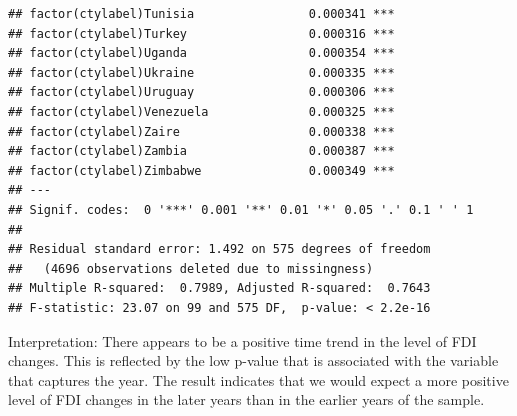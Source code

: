 \documentclass[12pt]{article}\usepackage[]{graphicx}\usepackage[]{color}
\makeatletter
\newenvironment{kframe}{%
 \def\at@end@of@kframe{}%
 \ifinner\ifhmode%
  \def\at@end@of@kframe{\end{minipage}}%
  \begin{minipage}{\columnwidth}%
 \fi\fi%
 \def\FrameCommand##1{\hskip\@totalleftmargin \hskip-\fboxsep
 \colorbox{shadecolor}{##1}\hskip-\fboxsep
     \hskip-\linewidth \hskip-\@totalleftmargin \hskip\columnwidth}%
 \MakeFramed {\advance\hsize-\width
   \@totalleftmargin\z@ \linewidth\hsize
   \@setminipage}}%
 {\par\unskip\endMakeFramed%
 \at@end@of@kframe}
\newenvironment{knitrout}{}{} %
\makeatother
\begin{document}
\begin{knitrout}
\begin{kframe}
\begin{verbatim}
## factor(ctylabel)Tunisia                0.000341 ***
## factor(ctylabel)Turkey                 0.000316 ***
## factor(ctylabel)Uganda                 0.000354 ***
## factor(ctylabel)Ukraine                0.000335 ***
## factor(ctylabel)Uruguay                0.000306 ***
## factor(ctylabel)Venezuela              0.000325 ***
## factor(ctylabel)Zaire                  0.000338 ***
## factor(ctylabel)Zambia                 0.000387 ***
## factor(ctylabel)Zimbabwe               0.000349 ***
## ---
## Signif. codes:  0 '***' 0.001 '**' 0.01 '*' 0.05 '.' 0.1 ' ' 1
## 
## Residual standard error: 1.492 on 575 degrees of freedom
##   (4696 observations deleted due to missingness)
## Multiple R-squared:  0.7989,	Adjusted R-squared:  0.7643 
## F-statistic: 23.07 on 99 and 575 DF,  p-value: < 2.2e-16
\end{verbatim}
\end{kframe}
\end{knitrout}

Interpretation: There appears to be a positive time trend in the level of FDI changes. This is reflected by the low p-value that is associated with the variable that captures the year. The result indicates that we would expect a more positive level of FDI changes in the later years than in the earlier years of the sample.
\end{document}
